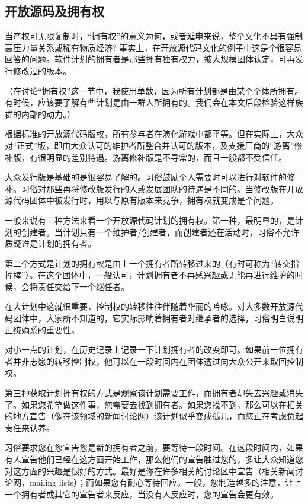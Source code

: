 \subsection{开放源码及拥有权}
当产权可无限复制时，“拥有权”的意义为何，或者延申来说，整个文化不具有强制高压力量关系或稀有物质经济?
事实上，在开放源代码文化的例子中这是个很容易回答的问题。软件计划的拥有者是那些拥有独有权力，被大规模团体认定，可再发行修改过的版本。

（在讨论“拥有权”这一节中，我使用单数，因为所有计划都是由某个个体所拥有。有时候，应该要了解有些计划是由一群人所拥有的。我们会在本文后段检验这样族群的内部的动力。）

根据标准的开放源代码版权，所有参与者在演化游戏中都平等。但在实际上，大众对“正式”版，即由大众认可的维护者所整合并认可的版本，及支援厂商的“游离”修补版，有很明显的差别待遇。游离修补版是不寻常的，而且一般都不受信任。

大众发行版是基础的是很容易了解的。习俗鼓励个人需要时可以进行对软件的修补。习俗对那些再将修改版发行的人或发展团队的待遇是不同的。当修改版在开放源代码团体中被发行时，用以与原有版本来竞争，拥有权就变成是个问题。

一般来说有三种方法来看一个开放源代码计划的拥有权。第一种，最明显的，是计划的创建者。当计划只有一个维护者/创建者，而创建者还在活动时，习俗不允许质疑谁是计划的拥有者。

第二个方式是计划的拥有权是由上一个拥有者所转移过来的（有时可称为“转交指挥棒”）。在这个团体中，一般认可，计划拥有者不再感兴趣或无能再进行维护的时候，会将责任交给下一个继任者。

在大计划中这就很重要，控制权的转移往往伴随着华丽的吟咏。对大多数开放源代码团体中，大家所不知道的，它实际影响着拥有者对继承者的选择，习俗明白说明正统嫡系的重要性。

对小一点的计划，在历史记录上记录一下计划拥有者的改变即可。如果前一位拥有者并非志愿的转移控制权，他可以在一段时间内在团体透过向大众公开来取回控制权。

第三种获取计划拥有权的方式是观察该计划需要工作，而拥有者却失去兴趣或消失了。如果您希望做这件事，您需要去找到拥有者。如果您找不到，那么可以在相关的地方宣告（像在该领域的新闻讨论网）该计划似乎变成孤儿，而您正在考虑负起责任来认养。

习俗要求您在您宣告您是新的拥有者之前，要等待一段时间。在这段时间内，如果有人宣告他们已经在这方面开始工作，那么他们的宣告胜过您的。多让大众知道您对这方面的兴趣是很好的方式。最好是你在许多相关的讨论区中宣告（相关新闻讨论网，mailing lists）；而如果您有耐心等待回应。一般，您制造越多的注意，让上一个拥有者或其它的宣告者来反应，当没有人反应时，您的宣告会更有效。

